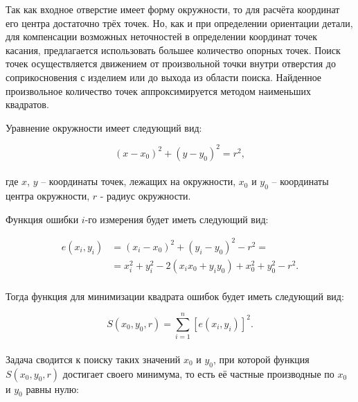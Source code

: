 Так как входное отверстие имеет форму окружности, то для расчёта координат его центра достаточно трёх точек.
Но, как и при определении ориентации детали, для компенсации возможных неточностей в определении координат точек касания, предлагается использовать большее количество опорных точек.
Поиск точек осуществляется движением от произвольной точки внутри отверстия до соприкосновения с изделием или до выхода из области поиска.
Найденное произвольное количество точек аппроксимируется методом наименьших квадратов.

Уравнение окружности имеет следующий вид:

\begin{equation*}
    \left( x - x_0 \right)^2 + \left( y - y_0 \right)^2 = r^2,
\end{equation*} \\
где $x$, $y$ -- координаты точек, лежащих на окружности, $x_0$ и $y_0$ -- координаты центра окружности, $r$ - радиус окружности.

Функция ошибки $i$-го измерения будет иметь следующий вид:

\begin{equation}
    \begin{aligned}
        \label{eq:Circle_MNK_e}
        e(x_i, y_i) &= \left( x_i - x_0 \right)^2 + \left( y_i - y_0 \right)^2 - r^2 = \\
        &= x_i^2 + y_i^2 - 2 (x_i x_0 + y_i y_0) + x_0^2 + y_0^2 - r^2.
    \end{aligned}
\end{equation} \\

Тогда функция для минимизации квадрата ошибок будет иметь следующий вид:

\begin{equation*}
    S(x_0, y_0, r) = \sum_{i=1}^{n} \left[ e(x_i, y_i) \right]^2.
\end{equation*} \\

Задача сводится к поиску таких значений $x_0$ и $y_0$, при которой функция $S(x_0, y_0, r)$ достигает своего минимума, то есть её частные производные по $x_0$ и $y_0$ равны нулю:

